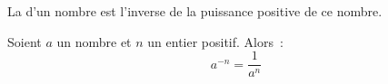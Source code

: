 La  d'un nombre est l'inverse de la puissance
positive de ce nombre. \par\noindent
Soient $a$ un nombre et $n$ un entier positif. Alors~:
$$a^{-n}=\dfrac{1}{a^n}$$